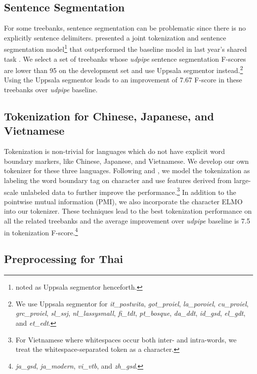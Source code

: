 \documentclass[11pt,a4paper]{article}
\begin{document}
\subsection{Sentence Segmentation}
For some treebanks, sentence segmentation can be problematic
since there is no explicitly sentence delimiters.
\citet{delhoneux-EtAl:2017:K17-3} presented a joint tokenization and
sentence segmentation model\footnote{noted as Uppsala segmentor henceforth.}
that outperformed the baseline model in last year's shared task \cite{udst:overview2017}.
We select a set of treebanks whose \textit{udpipe} sentence segmentation F-scores
are lower than 95 on the development set and use Uppsala segmentor instead.\footnote{
	We use Uppsala segmentor for \textit{it\_postwita}, \textit{got\_proiel}, \textit{la\_poroiel}, \textit{cu\_proiel},
	\textit{grc\_proiel}, \textit{sl\_ssj}, \textit{nl\_lassysmall}, \textit{fi\_tdt}, \textit{pt\_bosque}, \textit{da\_ddt}, \textit{id\_gsd},
	\textit{el\_gdt}, and \textit{et\_edt}.}
Using the Uppsala segmentor leads to an improvement of 7.67 F-score in these treebanks over \textit{udpipe} baseline.

\subsection{Tokenization for Chinese, Japanese, and Vietnamese}

Tokenization is non-trivial for languages 
which do not have explicit word boundary markers, like Chinese, Japanese, and Vietnamese.
We develop our own tokenizer for these three languages.
Following \citet{che-EtAl:2017:K17-3} and \citet{10.1007/978-3-319-69005-6_6}, we model the tokenization as labeling the
word boundary tag on character and 
use features derived from large-scale unlabeled data to further improve the performance.\footnote{For Vietnamese where whitespaces occur both inter- and intra-words, we treat the whitespace-separated token as a character.}
In addition to the pointwise mutual information (PMI), we also incorporate
the character ELMO into our tokenizer.
These techniques lead to the best tokenization performance on all the related treebanks
and the average improvement over \textit{udpipe} baseline is 7.5 in tokenization F-score.\footnote{\textit{ja\_gsd}, \textit{ja\_modern}, \textit{vi\_vtb}, and \textit{zh\_gsd}.}

\subsection{Preprocessing for Thai}
\end{document}

